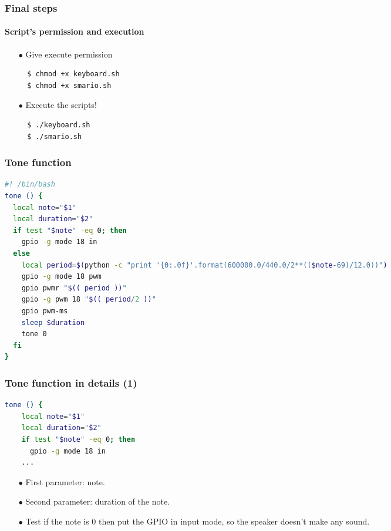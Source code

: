 \documentclass{beamer}
\begin{document}

\begin{frame}[fragile]
	\frametitle{\textbf{Final steps}}
	\framesubtitle{\textbf{Script's permission and execution}}

		\begin{itemize}
			\item[$\bullet$] Give execute permission
			\begin{lstlisting}
  $ chmod +x keyboard.sh
  $ chmod +x smario.sh
			\end{lstlisting}
			\item[$\bullet$] Execute the scripts!
			\begin{lstlisting}
  $ ./keyboard.sh
  $ ./smario.sh
			\end{lstlisting}
		\end{itemize}
\end{frame}



\begin{frame}[fragile]
	\frametitle{\textbf{Tone function}}
			\begin{lstlisting}[language=bash]
#! /bin/bash
tone () {
  local note="$1"
  local duration="$2"
  if test "$note" -eq 0; then
    gpio -g mode 18 in
  else
    local period=$(python -c "print '{0:.0f}'.format(600000.0/440.0/2**(($note-69)/12.0))")
    gpio -g mode 18 pwm
    gpio pwmr "$(( period ))"
    gpio -g pwm 18 "$(( period/2 ))"
    gpio pwm-ms
    sleep $duration
    tone 0
  fi
}

			\end{lstlisting}
\end{frame}



\begin{frame}[fragile]
	\frametitle{\textbf{Tone function in details (1)}}
  \begin{lstlisting}[language=bash]
  tone () {
    local note="$1"
    local duration="$2"
    if test "$note" -eq 0; then
      gpio -g mode 18 in
    ...
  \end{lstlisting}
  \begin{itemize}
  	\item[$\bullet$] First parameter: note.
  	\item[$\bullet$] Second parameter: duration of the note.
  	\item[$\bullet$] Test if the note is 0 then put the GPIO in input mode, so the speaker doesn’t make any sound. 
  \end{itemize}
\end{frame}
\end{document}
